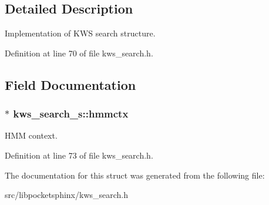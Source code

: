 \subsection{Detailed Description}
Implementation of K\+W\+S search structure. 

Definition at line 70 of file kws\+\_\+search.\+h.



\subsection{Field Documentation}
\subsubsection[{hmmctx}]{$\ast$ kws\+\_\+search\+\_\+s\+::hmmctx}\label{structkws__search__s_a0069d57702f921cbd1e2093148e7b672}


H\+M\+M context. 



Definition at line 73 of file kws\+\_\+search.\+h.



The documentation for this struct was generated from the following file\+:\begin{DoxyCompactItemize}
\item 
src/libpocketsphinx/kws\+\_\+search.\+h\end{DoxyCompactItemize}
